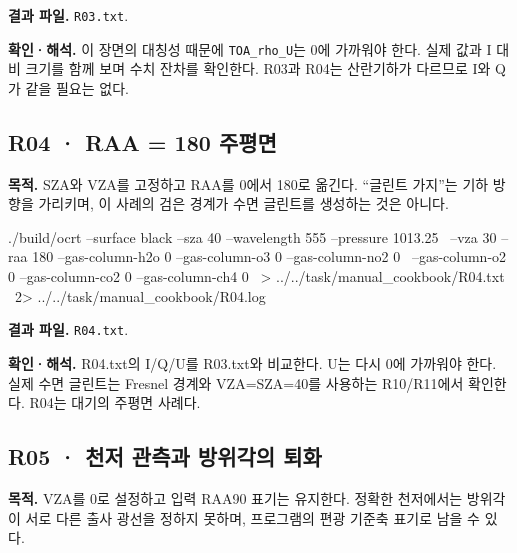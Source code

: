 \textbf{결과 파일. }\texttt{R03.txt}.

\textbf{확인·해석. }이 장면의 대칭성 때문에 \texttt{TOA\_\allowbreak{}rho\_\allowbreak{}U}는 0에 가까워야 한다. 실제 값과 I 대비 크기를 함께 보며 수치 잔차를 확인한다. R03과 R04는 산란기하가 다르므로 I와 Q가 같을 필요는 없다.


\subsection{R04 · RAA = 180 주평면}
\label{sec:auto:09_cookbook:2.4}

\label{recipe:R04}

\textbf{목적. }SZA와 VZA를 고정하고 RAA를 0\textdegree{}에서 180\textdegree{}로 옮긴다. “글린트 가지”는 기하 방향을 가리키며, 이 사례의 검은 경계가 수면 글린트를 생성하는 것은 아니다.

\noindent\begin{minipage}{\linewidth}
\begin{ManualCode}

./build/ocrt --surface black --sza 40 --wavelength 555 --pressure 1013.25 \
  --vza 30 --raa 180 --gas-column-h2o 0 --gas-column-o3 0 --gas-column-no2 0 \
  --gas-column-o2 0 --gas-column-co2 0 --gas-column-ch4 0 \
  > ../../task/manual_cookbook/R04.txt \
  2> ../../task/manual_cookbook/R04.log

\end{ManualCode}
\end{minipage}\par

\textbf{결과 파일. }\texttt{R04.txt}.

\textbf{확인·해석. }R04.txt의 I/Q/U를 R03.txt와 비교한다. U는 다시 0에 가까워야 한다. 실제 수면 글린트는 Fresnel 경계와 VZA=SZA=40\textdegree{}를 사용하는 R10/R11에서 확인한다. R04는 대기의 주평면 사례다.

\Needspace{17\baselineskip}

\subsection{R05 · 천저 관측과 방위각의 퇴화}
\label{sec:auto:09_cookbook:2.5}

\label{recipe:R05}

\textbf{목적. }VZA를 0\textdegree{}로 설정하고 입력 RAA90\textdegree{} 표기는 유지한다. 정확한 천저에서는 방위각이 서로 다른 출사 광선을 정하지 못하며, 프로그램의 편광 기준축 표기로 남을 수 있다.

